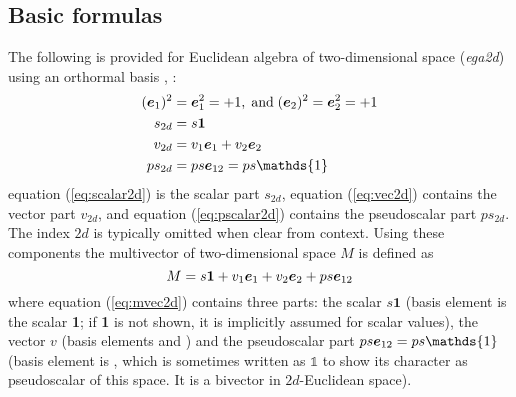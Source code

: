\subsection{Basic formulas}
\label{basic_formulas}

The following is provided for Euclidean algebra of two-dimensional space (\emph{ega2d})
using an orthormal basis , :
\begin{subequations}
    \begin{align}
        (\bv{1})^2 & = \bv{1}^2 = +1, \;\text{and}\; (\bv{2})^2 = \bv{2}^2 = +1
        \label{eq:ega2d_base_vec} \\
        s_{2d} & = s\bm{1}
        \label{eq:scalar2d} \\
        v_{2d} & = v_1\bv{1} + v_2\bv{2} 
        \label{eq:vec2d} \\
        ps_{2d} & = ps \bv{12}  = ps\mathds{1}
        \label{eq:pscalar2d}
    \end{align}
\end{subequations}
equation (\ref{eq:scalar2d}) is the scalar part $s_{2d}$, equation (\ref{eq:vec2d})
contains the vector part $v_{2d}$, and equation (\ref{eq:pscalar2d}) contains the
pseudoscalar part $ps_{2d}$. The index $2d$ is typically omitted when clear from context.
Using these components the multivector of two-dimensional space $M$ is defined as
\begin{equation}
     M = s \bm{1} + v_1\bm{e}_{1} + v_2\bm{e}_{2} + ps\bm{e}_{12}
    \label{eq:mvec2d}   
\end{equation}
where equation (\ref{eq:mvec2d}) contains three parts: the scalar $s\bm{1}$ (basis element
is the scalar \textbf{1}; if \textbf{1} is not shown, it is implicitly assumed for scalar
values), the vector $v$ (basis elements  and ) and the pseudoscalar part $ps
\bv{12} = ps \mathds{1}$ (basis element is , which is sometimes written as
$\mathds{1}$ to show its character as pseudoscalar of this space. It is a bivector in
$2d$-Euclidean space). \\

